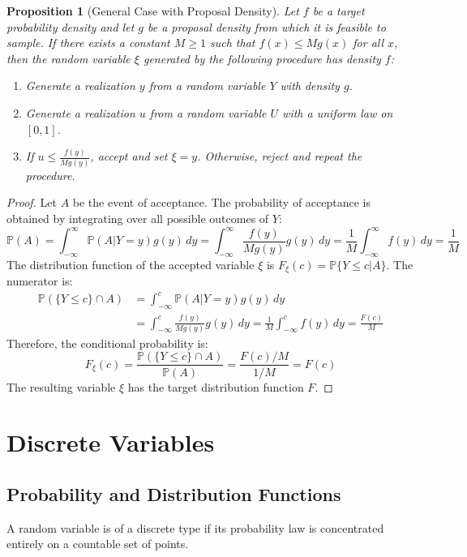 \documentclass[12pt, openany]{book}
\theoremstyle{definition}
\theoremstyle{plain}
\newtheorem{proposition}[definition]{Proposition}
\theoremstyle{remark}
\newcommand{\probP}{\mathbb{P}}
\begin{document}
\begin{proposition}[General Case with Proposal Density]
Let $f$ be a target probability density and let $g$ be a proposal density from which it is feasible to sample. If there exists a constant $M \ge 1$ such that $f(x) \le M g(x)$ for all $x$, then the random variable $\xi$ generated by the following procedure has density $f$:
\begin{enumerate}
    \item Generate a realization $y$ from a random variable $Y$ with density $g$.
    \item Generate a realization $u$ from a random variable $U$ with a uniform law on $[0,1]$.
    \item If $u \le \frac{f(y)}{M g(y)}$, accept and set $\xi = y$. Otherwise, reject and repeat the procedure.
\end{enumerate}
\end{proposition}
\begin{proof}
Let $A$ be the event of acceptance. The probability of acceptance is obtained by integrating over all possible outcomes of $Y$:
$$ \probP(A) = \int_{-\infty}^{\infty} \probP(A | Y=y) g(y) \,dy = \int_{-\infty}^{\infty} \frac{f(y)}{M g(y)} g(y) \,dy = \frac{1}{M} \int_{-\infty}^{\infty} f(y) \,dy = \frac{1}{M} $$
The distribution function of the accepted variable $\xi$ is $F_{\xi}(c) = \probP\{Y \le c | A\}$. The numerator is:
\begin{align*}
\probP(\{Y \le c\} \cap A) &= \int_{-\infty}^{c} \probP(A | Y=y) g(y) \,dy \\
&= \int_{-\infty}^{c} \frac{f(y)}{M g(y)} g(y) \,dy = \frac{1}{M} \int_{-\infty}^{c} f(y) \,dy = \frac{F(c)}{M}
\end{align*}
Therefore, the conditional probability is:
$$ F_{\xi}(c) = \frac{\probP(\{Y \le c\} \cap A)}{\probP(A)} = \frac{F(c)/M}{1/M} = F(c) $$
The resulting variable $\xi$ has the target distribution function $F$.
\end{proof}

\section{Discrete Variables}

\subsection{Probability and Distribution Functions}
A random variable is of a discrete type if its probability law is concentrated entirely on a countable set of points.
\end{document}

